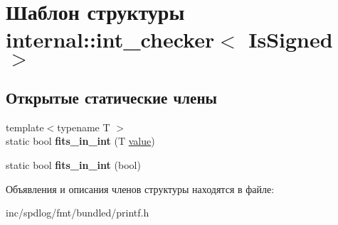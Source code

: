 \hypertarget{structinternal_1_1int__checker}{}\section{Шаблон структуры internal\+:\+:int\+\_\+checker$<$ Is\+Signed $>$}
\label{structinternal_1_1int__checker}
\subsection*{Открытые статические члены}
\begin{DoxyCompactItemize}
\item 
\mbox{\label{structinternal_1_1int__checker_af9178cfc98046c4321b2c98f5298c355}} 
{\footnotesize template$<$typename T $>$ }\\static bool {\bfseries fits\+\_\+in\+\_\+int} (T \hyperlink{classinternal_1_1value}{value})
\item 
\mbox{\label{structinternal_1_1int__checker_ad3e67a68050c931ed10605dae0ee3d1b}} 
static bool {\bfseries fits\+\_\+in\+\_\+int} (bool)
\end{DoxyCompactItemize}


Объявления и описания членов структуры находятся в файле\+:\begin{DoxyCompactItemize}
\item 
inc/spdlog/fmt/bundled/printf.\+h\end{DoxyCompactItemize}
